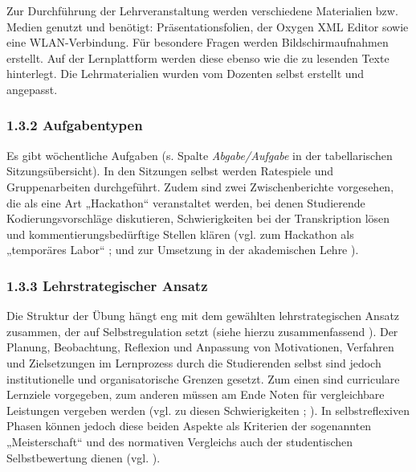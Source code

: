 \documentclass[
          a4paper,
        ]{article}
\begin{document}
Zur Durchführung der Lehrveranstaltung werden verschiedene Materialien
bzw. Medien genutzt und benötigt: Präsentationsfolien, der Oxygen XML
Editor sowie eine WLAN-Verbindung. Für besondere Fragen werden
Bildschirmaufnahmen erstellt. Auf der Lernplattform werden diese ebenso
wie die zu lesenden Texte hinterlegt. Die Lehrmaterialien wurden vom
Dozenten selbst erstellt und angepasst.

\subsubsection{1.3.2 Aufgabentypen}\label{aufgabentypen}

Es gibt wöchentliche Aufgaben (s. Spalte \emph{Abgabe/Aufgabe} in der
tabellarischen Sitzungsübersicht). In den Sitzungen selbst werden
Ratespiele und Gruppenarbeiten durchgeführt. Zudem sind zwei
Zwischenberichte vorgesehen, die als eine Art „Hackathon`` veranstaltet
werden, bei denen Studierende Kodierungsvorschläge diskutieren,
Schwierigkeiten bei der Transkription lösen und kommentierungsbedürftige
Stellen klären (vgl. zum Hackathon als „temporäres Labor``
; und zur Umsetzung
in der akademischen Lehre ).

\subsubsection{1.3.3 Lehrstrategischer
Ansatz}\label{lehrstrategischer-ansatz}

Die Struktur der Übung hängt eng mit dem gewählten lehrstrategischen
Ansatz zusammen, der auf Selbstregulation setzt (siehe hierzu
zusammenfassend ).
Der Planung, Beobachtung, Reflexion und Anpassung von Motivationen,
Verfahren und Zielsetzungen im Lernprozess durch die Studierenden selbst
sind jedoch institutionelle und organisatorische Grenzen gesetzt. Zum
einen sind curriculare Lernziele vorgegeben, zum anderen müssen am Ende
Noten für vergleichbare Leistungen vergeben werden (vgl. zu diesen
Schwierigkeiten ; ). In selbstreflexiven Phasen können jedoch diese beiden Aspekte als
Kriterien der sogenannten „Meisterschaft`` und des normativen Vergleichs
auch der studentischen Selbstbewertung dienen (vgl.
).
\end{document}
